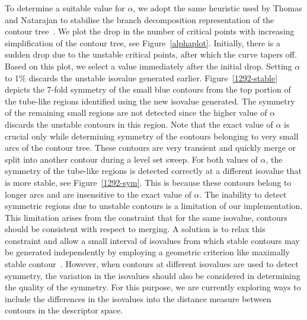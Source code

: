 \documentclass[review,journal]{vgtc}         %
\begin{document}
To determine a suitable value for $\alpha$, we adopt the same heuristic used by Thomas and Natarajan
to stabilise the branch decomposition representation of the contour tree~\cite{ThomN11}. We plot
the drop in the number of critical points with increasing simplification of the contour tree,
see Figure~\ref{alphaplot}. Initially, there is a sudden drop due to the unstable critical points, 
after which the curve tapers off. Based on this plot, we select a value immediately after the initial drop.
Setting $\alpha$ to 1\% discards the unstable isovalue generated earlier. 
Figure~\ref{1292-stable} depicts the 7-fold symmetry of the small blue contours from the top portion of
the tube-like regions identified using the new isovalue generated. The symmetry of the remaining small regions
are not detected since the higher value of $\alpha$ discards the unstable contours in this region. 
Note that the exact value of $\alpha$ is crucial only while determining symmetry of the contours belonging to 
very small arcs of the contour tree. These contours are very transient and quickly merge or split
into another contour during a level set sweep. For both values of $\alpha$, the symmetry of
the tube-like regions is detected correctly at a different isovalue that is more stable, 
see Figure~\ref{1292-sym}. This is because these contours belong to longer arcs and are 
insensitive to the exact value of $\alpha$. {\color{blue}The inability to detect symmetric
regions due to unstable contours is a limitation of our implementation. This limitation arises
from the constraint that for the same isovalue, contours should be consistent with respect to merging. A solution is
to relax this constraint and allow a small interval of isovalues from which stable contours 
may be generated independently by employing a geometric criterion like maximally stable contour~\cite{MatasCUP04}.
However, when contours at different isovalues are used to detect symmetry, the variation in the isovalues
should also be considered in determining the quality of the symmetry. For this purpose, we are currently
exploring ways to include the differences in the isovalues into the distance measure between contours
in the descriptor space.}
\end{document}
